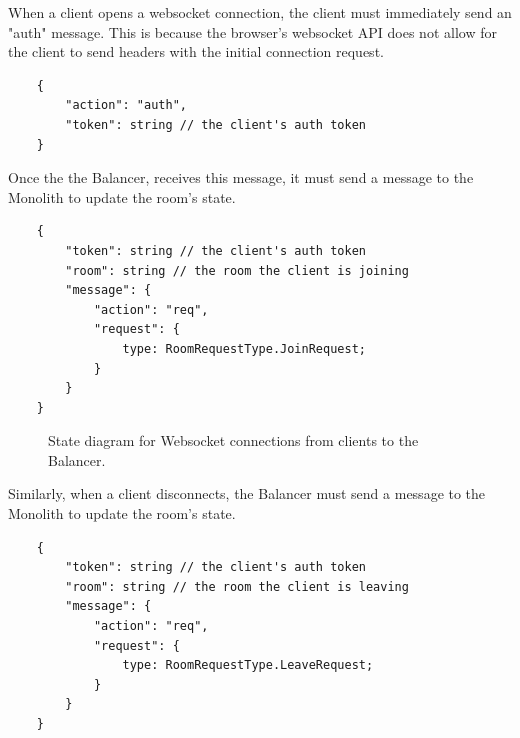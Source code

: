 When a client opens a websocket connection, the client must immediately send an "auth" message. This is because the browser's websocket API does not allow for the client to send headers with the initial connection request.

\begin{verbatim}
	{
		"action": "auth",
		"token": string // the client's auth token
	}
\end{verbatim}

Once the the Balancer, receives this message, it must send a message to the Monolith to update the room's state.

\begin{verbatim}
	{
		"token": string // the client's auth token
		"room": string // the room the client is joining
		"message": {
			"action": "req",
			"request": {
				type: RoomRequestType.JoinRequest;
			}
		}
	}
\end{verbatim}

\begin{figure}[h!]
	\centering
	\caption{State diagram for Websocket connections from clients to the Balancer.}
	\label{fig:client-connection-state}
\end{figure}

Similarly, when a client disconnects, the Balancer must send a message to the Monolith to update the room's state.

\begin{verbatim}
	{
		"token": string // the client's auth token
		"room": string // the room the client is leaving
		"message": {
			"action": "req",
			"request": {
				type: RoomRequestType.LeaveRequest;
			}
		}
	}
\end{verbatim}

